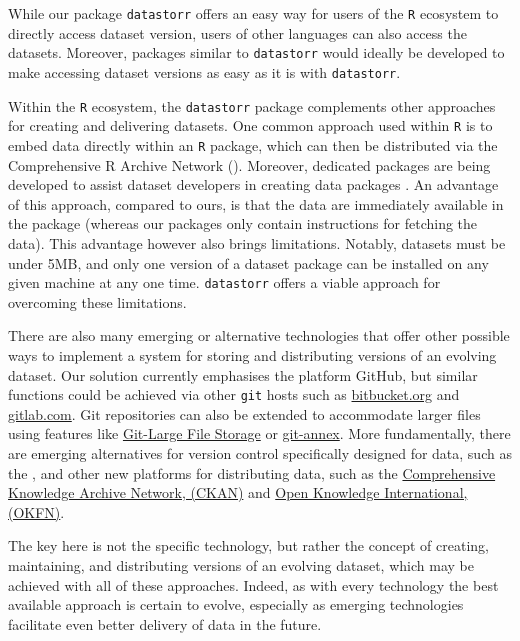 \documentclass[a4paper,num-refs]{assets/oup-contemporary}
\begin{document}
While our package \texttt{datastorr} offers an easy way for users of the \texttt{R} ecosystem to directly access dataset version, users of other languages can also access the datasets. Moreover, packages similar to \texttt{datastorr} would ideally be developed to make accessing dataset versions as easy as it is with \texttt{datastorr}.

Within the \texttt{R} ecosystem, the \texttt{datastorr} package complements other approaches for creating and delivering datasets. One common approach used within \texttt{R} is to embed data directly within an \texttt{R} package, which can then be distributed via the Comprehensive R Archive Network (). Moreover, dedicated packages are being developed to assist dataset developers in creating data packages \cite{Finak-2018}. An advantage of this approach, compared to ours, is that the data are immediately available in the package (whereas our packages only contain instructions for fetching the data). This advantage however also brings limitations. Notably, datasets must be under 5MB, and only one version of a dataset package can be installed on any given machine at any one time.  \texttt{datastorr} offers a viable approach for overcoming these limitations.

There are also many emerging or alternative technologies that offer other possible ways to implement a system for storing and distributing versions of an evolving dataset. Our solution currently emphasises the platform GitHub, but similar functions could be achieved via other \texttt{git} hosts such as \href{http://bitbucket.org}{bitbucket.org} and \href{http://gitlab.com}{gitlab.com}. Git repositories can also be extended to accommodate larger files using  features like \href{https://git-lfs.github.com/}{Git-Large File Storage} or \href{http://git-annex.branchable.com/}{git-annex}. More fundamentally, there are  emerging alternatives for version control specifically designed for data, such as the , and other new platforms for distributing data, such as the \href{https://en.wikipedia.org/wiki/CKAN}{Comprehensive Knowledge Archive Network, (CKAN)} and \href{https://okfn.org/}{Open Knowledge International, (OKFN)}. 

The key here is not the specific technology, but rather the concept of creating, maintaining, and distributing versions of an evolving dataset, which may be achieved with all of these approaches. Indeed, as with every technology the best available approach is certain to evolve, especially as emerging technologies facilitate even better delivery of data in the future.
\end{document}

